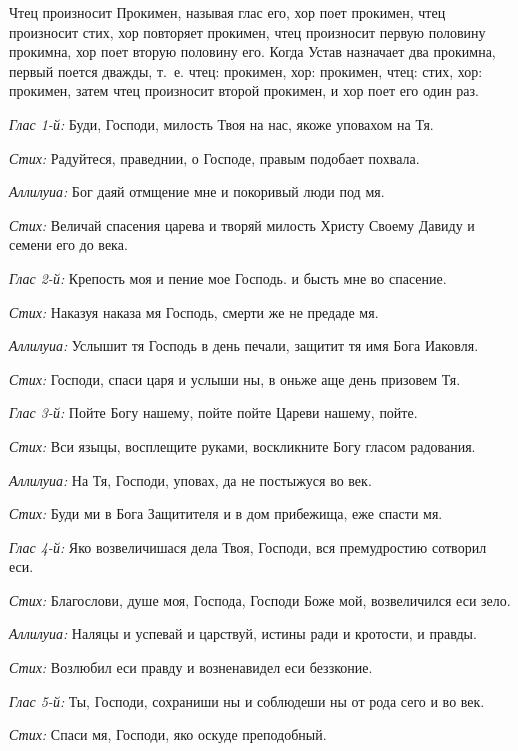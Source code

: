 \begin{mymulticols}
{Чтец произносит Прокимен, называя глас его, хор поет прокимен, чтец произносит стих, хор повторяет прокимен, чтец произносит первую половину прокимна, хор поет вторую половину его. Когда Устав назначает два прокимна, первый поется дважды, т.~е. чтец: прокимен, хор: прокимен, чтец: стих, хор: прокимен, затем чтец произносит второй прокимен, и хор поет его один раз.}




{\itshape Глас 1-й:} Буди, Господи, милость Твоя на нас, якоже уповахом на Тя.


{\itshape Стих:} Радуйтеся, праведнии, о Господе, правым подобает похвала.


{\itshape Аллилуиа:} Бог даяй отмщение мне и покоривый люди под мя.


{\itshape Стих:} Величай спасения царева и творяй милость Христу Своему Давиду и семени его до века.


{\itshape Глас 2-й:} Крепость моя и пение мое Господь. и бысть мне во спасение.


{\itshape Стих:} Наказуя наказа мя Господь, смерти же не предаде мя.


{\itshape Аллилуиа:} Услышит тя Господь в день печали, защитит тя имя Бога Иаковля.


{\itshape Стих:} Господи, спаси царя и услыши ны, в оньже аще день призовем Тя.


{\itshape Глас 3-й:} Пойте Богу нашему, пойте пойте Цареви нашему, пойте.


{\itshape Стих:} Вси языцы, восплещите руками, воскликните Богу гласом радования.


{\itshape Аллилуиа:} На Тя, Господи, уповах, да не постыжуся во век.


{\itshape Стих:} Буди ми в Бога Защитителя и в дом прибежища, еже спасти мя.


{\itshape Глас 4-й:} Яко возвеличишася дела Твоя, Господи, вся премудростию сотворил еси.


{\itshape Стих:} Благослови, душе моя, Господа, Господи Боже мой, возвеличился еси зело.


{\itshape Аллилуиа:} Наляцы и успевай и царствуй, истины ради и кротости, и правды.


{\itshape Стих:} Возлюбил еси правду и возненавидел еси беззконие.


{\itshape Глас 5-й:} Ты, Господи, сохраниши ны и соблюдеши ны от рода сего и во век.


{\itshape Стих:} Спаси мя, Господи, яко оскуде преподобный.



\end{mymulticols}
